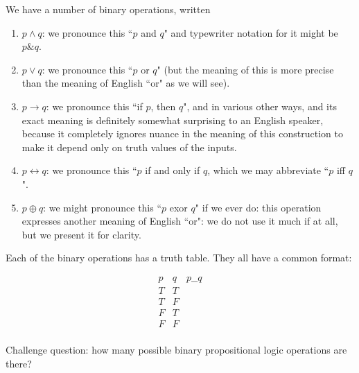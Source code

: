 \documentclass{slides}
\begin{document}
\begin{slide}

We have a number of binary operations, written 

\begin{enumerate}

\item $p \wedge q$:  we pronounce this ``$p$ and $q$" and typewriter notation for it might be $p \& q$.

\item $p \vee q$:  we pronounce this ``$p$ or $q$" (but the meaning of this is more precise than the meaning of English ``or" as we will see).

\item $p \rightarrow q$:  we pronounce this ``if $p$, then $q$", and in various other ways, and its exact meaning is definitely somewhat surprising to an English speaker, because it completely ignores nuance in the meaning of this construction to make it depend only on truth values of the inputs.



\item $p \leftrightarrow q$:  we pronounce this ``$p$ if and only if $q$, which we may abbreviate ``$p$ iff $q$".

\item $p \oplus q$:  we might pronounce this ``$p$ exor $q$" if we ever do:  this operation expresses another meaning of English ``or":  we do not use it much if at all, but we present it for clarity.

\end{enumerate}

Each of the binary operations has a truth table.  They all have a common format:

$$\begin{array}{cc|c}

p & q & p \_\_ q \\ \hline
T & T & \\
T & F & \\
F & T & \\
F & F & \\
\end{array}$$

Challenge question:  how many possible binary propositional logic operations are there?

\end{slide}
\end{document}
